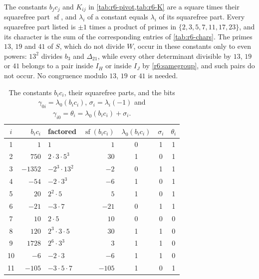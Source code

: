 The constants $b_jc_j$ and $K_{ij}$ in \cref{tab:r6-pivot,tab:r6-K} are a square times their squarefree part $\operatorname{sf}$, and $\lambda_i$ of a constant equals $\lambda_i$ of its squarefree part. Every squarefree part listed is $\pm1$ times a product of primes in $\{2,3,5,7,11,17,23\}$, and its character is the sum of the corresponding entries of \cref{tab:r6-chars}. The primes $13$, $19$ and $41$ of $S$, which do not divide $W$, occur in these constants only to even powers: $13^2$ divides $b_3$ and $\Delta_{21}$, while every other determinant divisible by $13$, $19$ or $41$ belongs to a pair inside $I_H$ or inside $I_J$ by \eqref{r6:samegroup}, and such pairs do not occur. No congruence modulo $13$, $19$ or $41$ is needed.

\begin{table}[htbp]
\centering
\caption{The constants $b_ic_i$, their squarefree parts, and the bits $\gamma_{0i}=\lambda_0(b_ic_i)$, $\sigma_i=\lambda_i(-1)$ and $\gamma_{i0}=\theta_i=\lambda_0(b_ic_i)+\sigma_i$.}
\label{tab:r6-pivot}
\begin{tabular}{crlrccc}
\toprule
$i$ & $b_ic_i$ & factored & $\operatorname{sf}(b_ic_i)$ & $\lambda_0(b_ic_i)$ & $\sigma_i$ & $\theta_i$\\
\midrule
1 & $1$ & $1$ & $1$ & 0 & 1 & 1 \\
2 & $750$ & $2\cdot3\cdot5^{3}$ & $30$ & 1 & 0 & 1 \\
3 & $-1352$ & $-2^{3}\cdot13^{2}$ & $-2$ & 0 & 1 & 1 \\
4 & $-54$ & $-2\cdot3^{3}$ & $-6$ & 1 & 0 & 1 \\
5 & $20$ & $2^{2}\cdot5$ & $5$ & 1 & 0 & 1 \\
6 & $-21$ & $-3\cdot7$ & $-21$ & 0 & 1 & 1 \\
7 & $10$ & $2\cdot5$ & $10$ & 0 & 0 & 0 \\
8 & $120$ & $2^{3}\cdot3\cdot5$ & $30$ & 1 & 1 & 0 \\
9 & $1728$ & $2^{6}\cdot3^{3}$ & $3$ & 1 & 1 & 0 \\
10 & $-6$ & $-2\cdot3$ & $-6$ & 1 & 1 & 0 \\
11 & $-105$ & $-3\cdot5\cdot7$ & $-105$ & 1 & 0 & 1 \\
\bottomrule
\end{tabular}
\end{table}

